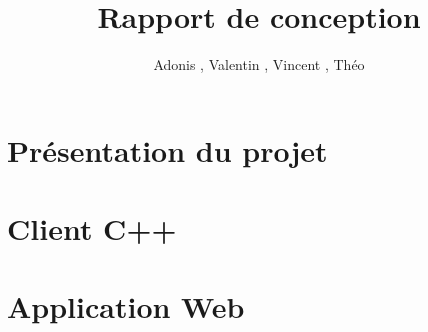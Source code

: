 \documentclass{report}
\title{Rapport de conception}
\author{Adonis \bsc{Najimi}, Valentin \bsc{Stern}, Vincent \bsc{Albert}, Théo \bsc{Gerriet}}
\begin{document}
\part{Présentation du projet}
\part{Client C++}
\part{Application Web}
\end{document}
